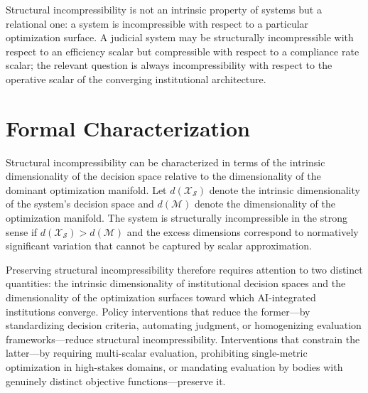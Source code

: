 \documentclass[12pt, oneside]{book}
\theoremstyle{plain}
\theoremstyle{definition}
\theoremstyle{remark}
\theoremstyle{definition}
\begin{document}
Structural incompressibility is not an intrinsic property of systems but a relational
one: a system is incompressible with respect to a particular optimization surface.
A judicial system may be structurally incompressible with respect to an efficiency
scalar but compressible with respect to a compliance rate scalar; the relevant
question is always incompressibility with respect to the operative scalar of the
converging institutional architecture.

\section{Formal Characterization}

Structural incompressibility can be characterized in terms of the intrinsic
dimensionality of the decision space relative to the dimensionality of the dominant
optimization manifold. Let $d(\mathcal{X}_\mathcal{S})$ denote the intrinsic
dimensionality of the system's decision space and $d(\mathcal{M})$ denote the
dimensionality of the optimization manifold. The system is structurally incompressible
in the strong sense if $d(\mathcal{X}_\mathcal{S}) > d(\mathcal{M})$ and the
excess dimensions correspond to normatively significant variation that cannot be
captured by scalar approximation.

Preserving structural incompressibility therefore requires attention to two distinct
quantities: the intrinsic dimensionality of institutional decision spaces and the
dimensionality of the optimization surfaces toward which AI-integrated institutions
converge. Policy interventions that reduce the former---by standardizing decision
criteria, automating judgment, or homogenizing evaluation frameworks---reduce
structural incompressibility. Interventions that constrain the latter---by requiring
multi-scalar evaluation, prohibiting single-metric optimization in high-stakes domains,
or mandating evaluation by bodies with genuinely distinct objective functions---preserve
it.
\end{document}
